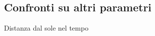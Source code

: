 \subsection[Cfr]{Confronti su altri parametri}
    \begin{frame}{Distanza dal sole nel tempo}
        
    \end{frame}